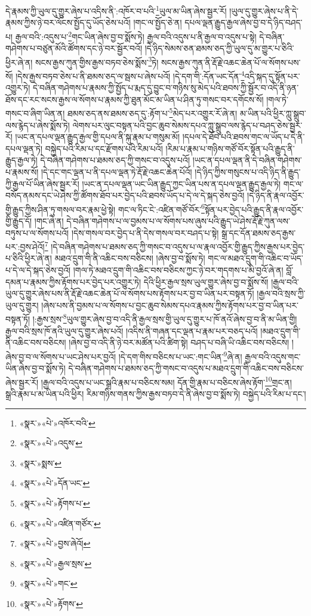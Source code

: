 དེ་རྣམས་ཀྱི་ཡུལ་དུ་གྱུར་ཞེས་པ་འདིས་ནི་:འཁོར་བ་པའི་\footnote{«སྣར་»«པེ་»འཁོར་བའི་}ཡུལ་མ་ཡིན་ཞེས་སྦྱར་རོ། །ཡུལ་དུ་གྱུར་ཞེས་པ་ནི་དེ་རྣམས་ཀྱིས་ཉེ་བར་ལོངས་སྤྱོད་དུ་ཡོད་ཅེས་པའོ། །གང་ལ་སྤྱོད་ཅེ་ན། དཔལ་ལྡན་རྒྱུད་རྒྱལ་ཞེས་བྱ་བ་དེ་ཉིད་བཤད་པ། རྒྱལ་བའི་:འདུས་པ་\footnote{«སྣར་»«པེ་»འདུས་}གང་ཡིན་ཞེས་བྱ་བ་སྨོས་ཏེ། རྒྱལ་བའི་འདུས་པ་ནི་རྒྱལ་བ་འདུས་པ་སྟེ། དེ་བཞིན་གཤེགས་པ་བཙུན་མོའི་ཚོགས་དང་ཉེ་བར་སྦྱོར་བའོ། །དེ་ཉིད་སེམས་ཅན་ཐམས་ཅད་ཀྱི་ཡུལ་དུ་མ་གྱུར་པ་ཅིའི་ཕྱིར་ཞེ་ན། སངས་རྒྱས་ཀུན་གྱིས་རྒྱས་བཏབ་ཅེས་སྨོས་\footnote{«སྣར་»སྨས་}ཏེ། སངས་རྒྱས་ཀུན་ནི་རྡོ་རྗེ་འཆང་ཆེན་པོ་ལ་སོགས་པས་སོ། །དེས་རྒྱས་བཏབ་ཅེས་པ་ནི་ཐམས་ཅད་ལ་སྦས་པ་ཞེས་པའོ། །དེ་དག་གི་:དོན་ཡང་དོན་\footnote{«སྣར་»«པེ་»དོན་ཡང་}འདི་སྐད་དུ་སྟོན་པར་འགྱུར་ཏེ། དེ་བཞིན་གཤེགས་པ་རྣམས་ཀྱི་སྤྱོད་པ་རྨད་དུ་བྱུང་བ་གཉིས་སུ་མེད་པའི་ཐབས་ཀྱི་སྦྱོར་བ་འདི་ནི་ཉན་ཐོས་དང་རང་སངས་རྒྱས་ལ་སོགས་པ་རྣམས་ཀྱི་ཐུན་མོང་མ་ཡིན་པ་ཤིན་ཏུ་གསང་བར་དགོངས་སོ། །གལ་ཏེ་གསང་བ་ཞིག་ཡིན་ན། ཐམས་ཅད་ནས་ཐམས་ཅད་དུ་:རྟོག་པ་\footnote{«སྣར་»«པེ་»རྟོགས་པ་}མེད་པར་འགྱུར་རོ་ཞེ་ན། མ་ཡིན་པའི་ཕྱིར་ཀླུ་སྒྲུབ་ལས་རྙེད་པ་ཞེས་སྨོས་ཏེ། ལེགས་པར་ལུང་བསྟན་པའི་བྱང་ཆུབ་སེམས་དཔའ་ཀླུ་སྒྲུབ་ལས་རྙེད་པ་བཤད་ཅེས་སྦྱར་རོ། །ཡང་ན་དཔལ་ལྡན་རྒྱུད་རྒྱལ་གྱི་དཔལ་ནི་སྐུ་རྣམ་པ་གསུམ་མོ། །དཔལ་དེ་ཐོབ་པའི་ཐབས་གང་ལ་ཡོད་པ་དེ་ནི་དཔལ་ལྡན་ཏེ། བསྐྱེད་པའི་རིམ་པ་དང་རྫོགས་པའི་རིམ་པའོ། །རིམ་པ་རྣམ་པ་གཉིས་གཙོ་བོར་སྟོན་པའི་རྒྱུད་ནི་རྒྱུད་རྒྱལ་ཏེ། དེ་བཞིན་གཤེགས་པ་ཐམས་ཅད་ཀྱི་གསང་བ་འདུས་པའོ། །ཡང་ན་དཔལ་ལྡན་ནི་དེ་བཞིན་གཤེགས་པ་རྣམས་སོ། །དེ་དང་གང་ལྡན་པ་ནི་དཔལ་ལྡན་ཏེ་རྡོ་རྗེ་འཆང་ཆེན་པོའོ། །དེ་ཉིད་ཀྱིས་གསུངས་པ་འདི་ཉིད་ནི་རྒྱུད་ཀྱི་རྒྱལ་པོ་ཡིན་ཞེས་སྦྱར་རོ། །ཡང་ན་དཔལ་ལྡན་ཡང་ཡིན་རྒྱུད་ཀྱང་ཡིན་པས་ན་དཔལ་ལྡན་རྒྱུད་རྒྱལ་ཏེ། གང་ལ་བསོད་ནམས་དང་ཡེ་ཤེས་ཀྱི་ཚོགས་ཐོབ་པར་བྱེད་པའི་ཐབས་ཡོད་པ་དེ་ལ་དེ་སྐད་ཅེས་བྱའོ། །དེ་ཉིད་ནི་རྣལ་འབྱོར་གྱི་རྒྱུད་ཀྱིས་ཤིན་ཏུ་གསལ་བར་རྣམ་ཕྱེ་སྟེ། གང་ལ་ཏིང་ངེ་:འཛིན་གཙོ་བོར་\footnote{«སྣར་»«པེ་»འཛིན་གཙོར་}སྟོན་པར་བྱེད་པའི་རྒྱུད་ནི་རྣལ་འབྱོར་གྱི་རྒྱུད་དོ། །གང་ཞེ་ན། དེ་བཞིན་གཤེགས་པ་ལ་བྱམས་པ་ལ་སོགས་པས་ཞུས་པའི་རྒྱུད་ཡེ་ཤེས་རྡོ་རྗེ་ཀུན་ལས་བཏུས་པ་ལ་སོགས་པའོ། །དེས་གསལ་བར་བྱེད་པ་ནི་དེས་གསལ་བར་བཤད་པ་སྟེ། སྒྲ་དང་དོན་ཐམས་ཅད་རྒྱས་པར་:བྱས་ཤེའོ།\footnote{«སྣར་»«པེ་»བྱས་ཞེའོ།} །དེ་བཞིན་གཤེགས་པ་ཐམས་ཅད་ཀྱི་གསང་བ་འདུས་པ་ལ་རྣལ་འབྱོར་གྱི་རྒྱུད་ཀྱིས་རྒྱས་པར་བྱེད་པ་ཅིའི་ཕྱིར་ཞེ་ན། མཐའ་དྲུག་གི་ནི་འཆིང་བས་བཅིངས། །ཞེས་བྱ་བ་སྨོས་ཏེ། གང་ལ་མཐའ་དྲུག་གི་འཆིང་བ་ཡོད་པ་དེ་ལ་དེ་སྐད་ཅེས་བྱའོ། །གལ་ཏེ་མཐའ་དྲུག་གི་འཆིང་བས་བཅིངས་ཀྱང་ཉེ་བར་གདགས་པ་མི་བྱའོ་ཞེ་ན། བློ་དམན་པ་རྣམས་ཀྱིས་རྟོགས་པར་བྱེད་པར་འགྱུར་ཏེ། དེའི་ཕྱིར་རྒྱལ་སྲས་ཡུལ་གྱུར་ཞེས་བྱ་བ་སྨོས་སོ། །རྒྱལ་བའི་ཡུལ་དུ་གྱུར་ཞེས་པས་ནི་རྡོ་རྗེ་འཆང་ཆེན་པོ་ལ་སོགས་པས་རྟོགས་པར་བྱ་བ་ཡིན་པར་བསྟན་ཏོ། །རྒྱལ་བའི་སྲས་ཀྱི་ཡུལ་དུ་གྱུར། །ཞེས་པས་ནི་བྱམས་པ་ལ་སོགས་པ་བྱང་ཆུབ་སེམས་དཔའ་རྣམས་ཀྱིས་རྟོགས་པར་བྱ་བ་ཡིན་པར་བསྟན་ཏོ། །:རྒྱས་སྲས་\footnote{«སྣར་»«པེ་»རྒྱལ་སྲས་}ཡུལ་གྱུར་ཞེས་བྱ་བ་འདི་ནི་རྒྱལ་སྲས་གྱི་ཡུལ་དུ་གྱུར་པ་ཁོ་ནའོ་ཞེས་བྱ་བ་ནི་མ་ཡིན་གྱི། རྒྱལ་བའི་སྲས་ཁོ་ནའི་ཡུལ་དུ་གྱུར་ཞེས་པའོ། །འདིས་ནི་གཞན་དང་ལྡན་པ་རྣམ་པར་བཅད་པའོ། །མཐའ་དྲུག་གི་ནི་འཆིང་བས་བཅིངས། །ཞེས་བྱ་བ་འདི་ནི་ཉེ་བར་མཚོན་པའི་ཚིག་སྟེ། བཤད་པ་བཞི་ཡི་འཆིང་བས་བཅིངས། །ཞེས་བྱ་བ་ལ་སོགས་པ་ཡང་ཤེས་པར་བྱའོ། །དེ་དག་གིས་བཅིངས་པ་ཡང་:གང་ཡིན་\footnote{«སྣར་»«པེ་»གང་}ཞེ་ན། རྒྱལ་བའི་འདུས་གང་ཡིན་ཞེས་བྱ་བ་སྨོས་ཏེ། དེ་བཞིན་གཤེགས་པ་ཐམས་ཅད་ཀྱི་གསང་བ་འདུས་པ་མཐའ་དྲུག་གི་འཆིང་བས་བཅིངས་ཞེས་སྦྱར་རོ། །རྒྱལ་བའི་འདུས་པ་ཡང་སྒྲའི་རྣམ་པ་བཅིངས་སམ། དོན་གྱི་རྣམ་པ་བཅིངས་ཞེས་རྟོག་\footnote{«སྣར་»«པེ་»རྟོགས་}གྲང་ན། སྒྲའི་རྣམ་པ་མ་ཡིན་པའི་ཕྱིར། རིམ་གཉིས་གནས་ཀྱིས་རྒྱས་བཏབ་དེ་ནི་ཞེས་བྱ་བ་སྨོས་ཏེ། བསྐྱེད་པའི་རིམ་པ་དང་། 